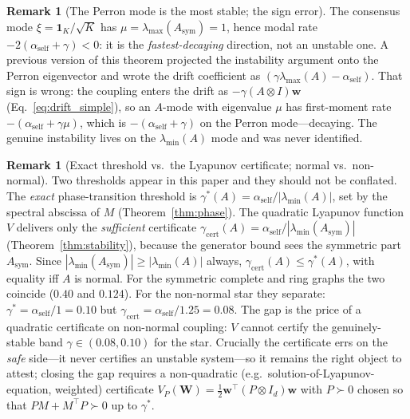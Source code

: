 \documentclass[12pt]{article}
\theoremstyle{plain}
\theoremstyle{definition}
\newtheorem{remark}[theorem]{Remark}
\newcommand{\W}{\mathbf{W}}
\newcommand{\abs}[1]{\left| #1 \right|}
\begin{document}
\begin{remark}[The Perron mode is the most stable; the sign error]
\label{rem:signerror}
The consensus mode $\xi=\mathbf 1_K/\sqrt K$ has
$\mu=\lambda_{\max}(A_{\mathrm{sym}})=1$, hence modal rate
$-2(\alpha_{\mathrm{self}}+\gamma)<0$: it is the \emph{fastest-decaying}
direction, not an unstable one.  A previous version of this theorem
projected the instability argument onto the Perron eigenvector and wrote
the drift coefficient as $(\gamma\lambda_{\max}(A)-\alpha_{\mathrm{self}})$.
That sign is wrong: the coupling enters the drift as $-\gamma(A\otimes I)\mathbf w$
(Eq.~\eqref{eq:drift_simple}), so an $A$-mode with eigenvalue $\mu$ has
first-moment rate $-(\alpha_{\mathrm{self}}+\gamma\mu)$, which is
$-(\alpha_{\mathrm{self}}+\gamma)$ on the Perron mode---decaying.  The
genuine instability lives on the $\lambda_{\min}(A)$ mode and was never
identified.
\end{remark}

\begin{remark}[Exact threshold vs.\ the Lyapunov certificate; normal vs.\ non-normal]
\label{rem:moments}
Two thresholds appear in this paper and they should not be conflated.  The
\emph{exact} phase-transition threshold is
$\gamma^*(A)=\alpha_{\mathrm{self}}/\abs{\lambda_{\min}(A)}$, set by the
spectral abscissa of $M$ (Theorem~\ref{thm:phase}).  The quadratic Lyapunov
function $V$ delivers only the \emph{sufficient} certificate
$\gamma_{\mathrm{cert}}(A)=\alpha_{\mathrm{self}}/\abs{\lambda_{\min}(A_{\mathrm{sym}})}$
(Theorem~\ref{thm:stability}), because the generator bound sees the
symmetric part $A_{\mathrm{sym}}$.  Since
$\abs{\lambda_{\min}(A_{\mathrm{sym}})}\ge\abs{\lambda_{\min}(A)}$ always,
$\gamma_{\mathrm{cert}}(A)\le\gamma^*(A)$, with equality iff $A$ is normal.
For the symmetric complete and ring graphs the two coincide
($0.40$ and $0.124$).  For the non-normal star they separate:
$\gamma^*=\alpha_{\mathrm{self}}/1=0.10$ but
$\gamma_{\mathrm{cert}}=\alpha_{\mathrm{self}}/1.25=0.08$.  The gap is the
price of a quadratic certificate on non-normal coupling: $V$ cannot certify
the genuinely-stable band $\gamma\in(0.08,0.10)$ for the star.  Crucially the
certificate errs on the \emph{safe} side---it never certifies an unstable
system---so it remains the right object to attest; closing the gap requires
a non-quadratic (e.g.\ solution-of-Lyapunov-equation, weighted) certificate
$V_P(\W)=\tfrac12\mathbf w^\top(P\otimes I_d)\mathbf w$ with $P\succ0$ chosen
so that $PM+M^\top P\succ0$ up to $\gamma^*$.
\end{remark}
\end{document}
